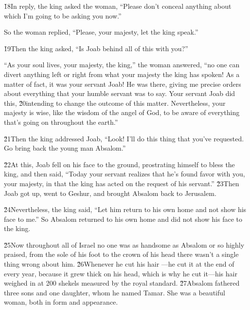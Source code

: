 \v{18}In reply, the king asked the woman, ``Please don't conceal anything about which I'm going to be asking you now.''

So the woman replied, ``Please, your majesty, let the king speak.''

\v{19}Then the king asked, ``Is Joab behind all of this with you?''

``As your soul lives, your majesty, the king,'' the woman answered, ``no one can divert anything left or right from what your majesty the king has spoken! As a matter of fact, it was your servant Joab! He was there, giving me precise orders about everything that your humble servant was to say. Your servant Joab did this, \v{20}intending to change the outcome of this matter. Nevertheless, your majesty is wise, like the wisdom of the angel of God, to be aware of everything that's going on throughout the earth.''

\v{21}Then the king addressed Joab, ``Look! I'll do this thing that you've requested. Go bring back the young man Absalom.''

\v{22}At this, Joab fell on his face to the ground, prostrating himself to bless the king, and then said, ``Today your servant realizes that he's found favor with you, your majesty, in that the king has acted on the request of his servant.'' \v{23}Then Joab got up, went to Geshur, and brought Absalom back to Jerusalem.

\v{24}Nevertheless, the king said, ``Let him return to his own home and not show his face to me.'' So Absalom returned to his own home and did not show his face to the king.

\v{25}Now throughout all of Israel no one was as handsome as Absalom or so highly praised, from the sole of his foot to the crown of his head there wasn't a single thing wrong about him. \v{26}Whenever he cut his hair ---he cut it at the end of every year, because it grew thick on his head, which is why he cut it---his hair weighed in at 200 shekels measured by the royal standard. \v{27}Absalom fathered three sons and one daughter, whom he named Tamar. She was a beautiful woman, both in form and appearance.

